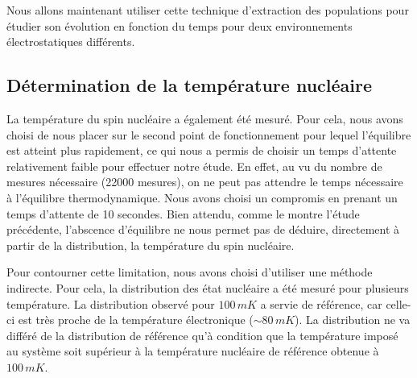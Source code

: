 Nous allons maintenant utiliser cette technique d'extraction des populations pour étudier son évolution en fonction du temps pour deux environnements électrostatiques différents.


\subsection{Détermination de la température nucléaire}
La température du spin nucléaire a également été mesuré. Pour cela, nous avons choisi de nous placer sur le second point de fonctionnement pour lequel l'équilibre est atteint plus rapidement, ce qui nous  a permis de choisir un temps d'attente relativement faible pour effectuer notre étude. En effet, au vu du nombre de mesures nécessaire (22000 mesures), on ne peut pas attendre le temps nécessaire à l'équilibre thermodynamique. Nous avons choisi un compromis en prenant un temps d'attente de 10 secondes. Bien attendu, comme le montre l'étude précédente, l'abscence d'équilibre ne nous permet pas de déduire, directement à partir de la distribution, la température du spin nucléaire.

Pour contourner cette limitation, nous avons choisi d'utiliser une méthode indirecte. Pour cela, la distribution des état nucléaire a été mesuré pour plusieurs température. La distribution observé pour $100\,mK$ a servie de référence, car celle-ci est très proche de la température électronique ($\sim 80\,mK$). La distribution ne va différé de la distribution de référence qu'à condition que la température imposé au système soit supérieur à la température nucléaire de référence obtenue à $100\,mK$.

